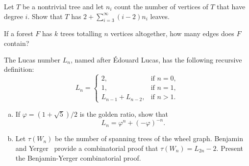 \begin{problem}
\item Let $T$ be a nontrivial tree and let $n_i$ count the number of
  vertices of $T$ that have degree $i$. Show that $T$ has
  $2 + \sum_{i=3}^\infty (i - 2) n_i$ leaves.

\item If a forest $F$ has $k$ trees totalling $n$ vertices altogether,
  how many edges does $F$ contain?

\item The Lucas number $L_n$, named after
  \'Edouard Lucas, has the following recursive
  definition:
  \[
  L_n
  =
  \begin{cases}
  2, & \text{if } n = 0, \\[4pt]
  1, & \text{if } n = 1, \\[4pt]
  L_{n-1} + L_{n-2}, & \text{if } n > 1.
  \end{cases}
  \]
  \begin{enumerate}[(a)]
  \item If $\varphi = (1 + \sqrt{5}) / 2$ is the
    golden ratio, show that
    \[
    L_n
    =
    \varphi^n + (-\varphi)^{-n}.
    \]

  \item Let $\tau(W_n)$ be the number of
    spanning trees of the
    wheel graph.
    Benjamin and
    Yerger~\cite{BenjaminYerger2006} provide a
    combinatorial proof that $\tau(W_n) = L_{2n} - 2$. Present the
    Benjamin-Yerger combinatorial proof.
  \end{enumerate}
\end{problem}
